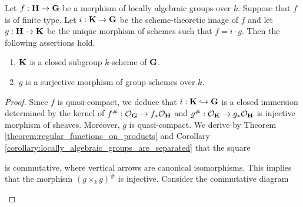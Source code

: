 \begin{theorem}\label{theorem:images_of_locally_algebraic_groups_homomorphisms}
Let $f:\bd{H}\ra \bd{G}$ be a morphism of locally algebraic groups over $k$. Suppose that $f$ is of finite type. Let $i:\bd{K}\ra \bd{G}$ be the scheme-theoretic image of $f$ and let $g:\bd{H}\ra \bd{K}$ be the unique morphism of schemes such that $f = i\cdot g$. Then the following assertions hold.
\begin{enumerate}[label=\emph{\textbf{(\arabic*)}}, leftmargin=3.0em]
\item $\bd{K}$ is a closed subgroup $k$-scheme of $\bd{G}$.
\item $g$ is a surjective morphism of group schemes over $k$.
\end{enumerate}
\end{theorem}
\begin{proof}
Since $f$ is quasi-compact, we deduce that $i:\bd{K} \hookrightarrow \bd{G}$ is a closed immersion determined by the kernel of $f^{\#}:\cO_{\bd{G}}\ra f_*\cO_{\bd{H}}$ and $g^{\#}:\cO_{\bd{K}}\ra g_*\cO_{\bd{H}}$ is injective morphism of sheaves. Moreover, $g$ is quasi-compact. We derive by Theorem \ref{theorem:regular_functions_on_products} and Corollary \ref{corollary:locally_algebraic_groups_are_separated} that the square
\begin{center}
\end{center}
is commutative, where vertical arrows are canonical isomorphisms. This implies that the morphism $\left(g\times_k g\right)^{\#}$ is injective. Consider the commutative diagram
\begin{center}
\begin{tikzpicture}

\end{tikzpicture}
\end{center}
\end{proof}
